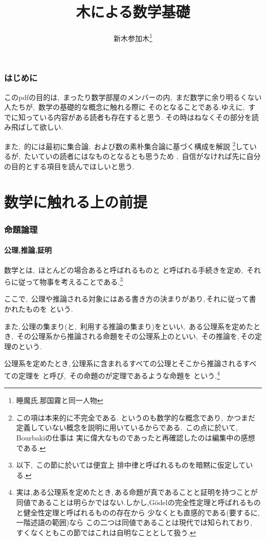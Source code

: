 \documentclass[hyperref,a4paper,12pt]{kininaruki}
\title{木による数学基礎}
\author{新木参加木\thanks{睡魔氏,那国霧と同一人物}}
\date{}
\begin{document}
\maketitle
\section*{はじめに}
このpdfの目的は,\, まったり数学部屋のメンバーの内,\, まだ数学に余り明るくない人たちが,\, 数学の基礎的な概念に触れる際に
そのとなることである.ゆえに,\, すでに知っている内容がある読者も存在すると思う.
その時はねなくその部分を読み飛ばして欲しい.

また,\, 的には最初に集合論,\, および数の素朴集合論に基づく構成を解説
\footnote{この項は本来的に不完全である.%
というのも数学的な概念であり,\, かつまだ定義していない概念を説明に用いているからである.%
\,この点に於いて,\, Bourbakiの仕事は%
実に偉大なものであったと再確認したのは編集中の感想である.}しているが,\, 
たいていの読者にはなものとなるとも思うため%
,\, 自信がなければ先に自分の目的とする項目を読んでほしいと思う.
\newpage
\tableofcontents
\newpage
\part{数学に触れる上の前提}
\section{命題論理}
\subsection{公理,推論,証明}
数学とは,\, ほとんどの場合あると呼ばれるものと%
と呼ばれる手続きを定め,\, それらに従って物事を考えることである.\footnote{以下,\, この節に於いては便宜上%
排中律と呼ばれるものを暗黙に仮定している.}

ここで,\, 公理や推論される対象にはある書き方の決まりがあり,\,それに従って書かれたものを%
という.

また,\,公理の集まり(と,\, 利用する推論の集まり)をといい,\, %
ある公理系を定めたとき,\, その公理系から推論される命題をその公理系上のといい,\, %
その推論を,\,その定理のという.

公理系を定めたとき,\,公理系に含まれるすべての公理とそこから推論されるすべての定理を%
と呼び,\, %
その命題のが定理であるような命題を%
という.\footnote{実は,ある公理系を定めたとき,\,ある命題が真であることと証明を持つことが%
同値であることは明らかではない.しかし,G\"{o}delの完全性定理と呼ばれるものと健全性定理と呼ばれるものの存在から%
少なくとも直感的である(要するに,\, 一階述語の範囲)なら%
この二つは同値であることは現代では知られており,\, %
すくなくともこの節ではこれは自明なこととして扱う.
}
\newpage
\end{document}
